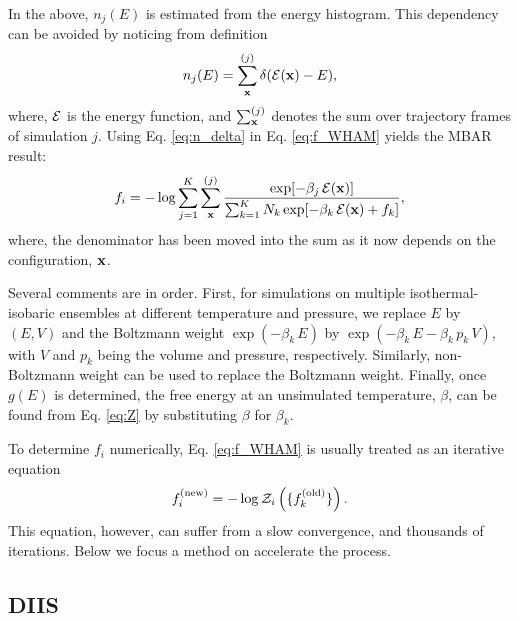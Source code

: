 \documentclass[aip,jcp,preprint,superscriptaddress]{revtex4-1}
\begin{document}
In the above,
$n_j(E)$ is estimated from the energy histogram.
%
This dependency can be avoided
by noticing from definition
%
\begin{equation}
n_j(E)
=
\sum_{\mathbf{x}}^{(j)} \delta(\mathcal{E}(\mathbf{x}) - E),
\label{eq:n_delta}
\end{equation}
%
where,
$\mathcal{E}$
is the energy function,
and
$\sum_{\mathbf{x}}^{(j)}$
denotes the sum over trajectory frames
of simulation $j$.
%
%
%
Using Eq. \eqref{eq:n_delta} in Eq. \eqref{eq:f_WHAM} yields
the MBAR\cite{shirts2008} result:
%
\begin{equation}
f_i
=
-\log
\sum_{j = 1}^K
\sum_{\mathbf{x}}^{(j)}
\frac{
  \exp[-\beta_j \, \mathcal{E}(\mathbf{x})]
}
{
  \sum_{k = 1}^K N_k \exp[-\beta_k \, \mathcal{E}(\mathbf{x}) + f_k]
},
\label{eq:f_MBAR}
\end{equation}
%
where,
the denominator has been moved into the sum
as it now depends on the configuration, $\mathbf{x}$.



Several comments are in order.
%
First,
for simulations on multiple isothermal-isobaric ensembles
at different temperature and pressure,
%
we replace $E$ by $(E, V)$
and the Boltzmann weight
$\exp(-\beta_k \, E)$
by
$\exp(-\beta_k \, E - \beta_k \, p_k \, V)$,
with
$V$ and $p_k$
being the volume and pressure,
respectively.
%
Similarly,
non-Boltzmann weight\cite{
mezei1987, *berg1992, *lee1993, *tsallis1988}
can be used to replace the Boltzmann weight.
%
Finally,
once $g(E)$ is determined,
the free energy at an unsimulated temperature, $\beta$,
can be found from Eq. \eqref{eq:Z}
by substituting $\beta$ for $\beta_k$.


To determine $f_i$ numerically,
Eq. \eqref{eq:f_WHAM}
is usually treated as an iterative equation
%
\begin{equation}
f_i^\mathrm{(new)}
=
-\log \mathcal{Z}_i\left(
  \{ f_k^\mathrm{(old)} \}
\right).
\end{equation}
%
This equation, however,
can suffer from a slow convergence,
and thousands of iterations\cite{
bereau2009, kim2011}.
%
Below we focus a method on accelerate the process.





\subsection{DIIS}
\end{document}
